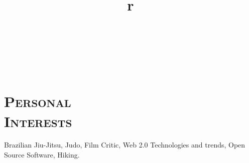 \begin{resume}
\begin{formatb}
  \title{r}\\
  \\
 \body\\
\end{formatb}





\section{\textsc{Personal\\ Interests}}
\employer{}
\title{}
\location{} 
\dates{}
Brazilian Jiu-Jitsu, Judo, Film Critic, Web 2.0 Technologies and trends, Open Source Software, Hiking.


\end{resume}
